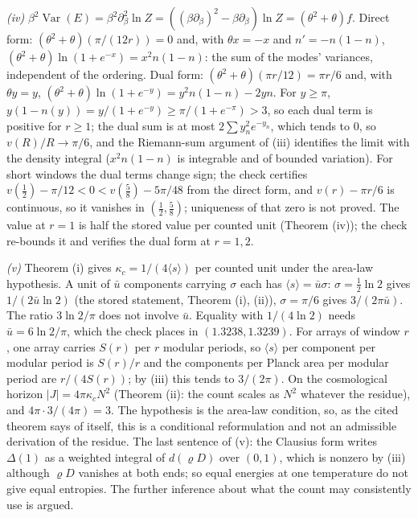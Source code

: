 \emph{(iv)} $\beta^{2}\operatorname{Var}(E) = \beta^{2}\partial_{\beta}^{2}\ln Z = ((\beta\partial_{\beta})^{2} - \beta\partial_{\beta})\ln Z = (\theta^{2} + \theta)f$. Direct form: $(\theta^{2} + \theta)(\pi/(12r)) = 0$ and, with $\theta x = -x$ and $n' = -n(1 - n)$, $(\theta^{2} + \theta)\ln(1 + e^{-x}) = x^{2}n(1 - n)$: the sum of the modes' variances, independent of the ordering. Dual form: $(\theta^{2} + \theta)(\pi r/12) = \pi r/6$ and, with $\theta y = y$, $(\theta^{2} + \theta)\ln(1 + e^{-y}) = y^{2}n(1 - n) - 2yn$. For $y \ge \pi$, $y(1 - n(y)) = y/(1 + e^{-y}) \ge \pi/(1 + e^{-\pi}) > 3$, so each dual term is positive for $r \ge 1$; the dual sum is at most $2\sum y_{n}^{2}e^{-y_{n}}$, which tends to $0$, so $v(R)/R \to \pi/6$, and the Riemann-sum argument of (iii) identifies the limit with the density integral ($x^{2}n(1 - n)$ is integrable and of bounded variation). For short windows the dual terms change sign; the check certifies $v(\tfrac12) - \pi/12 < 0 < v(\tfrac58) - 5\pi/48$ from the direct form, and $v(r) - \pi r/6$ is continuous, so it vanishes in $(\tfrac12, \tfrac58)$; uniqueness of that zero is not proved. The value at $r = 1$ is half the stored value per counted unit (Theorem (iv)); the check re-bounds it and verifies the dual form at $r = 1, 2$.

\emph{(v)} Theorem (i) gives $\kappa_{c} = 1/(4\langle s\rangle)$ per counted unit under the area-law hypothesis. A unit of $\bar u$ components carrying $\sigma$ each has $\langle s\rangle = \bar u\sigma$: $\sigma = \tfrac12\ln 2$ gives $1/(2\bar u\ln 2)$ (the stored statement, Theorem (i), (ii)), $\sigma = \pi/6$ gives $3/(2\pi\bar u)$. The ratio $3\ln 2/\pi$ does not involve $\bar u$. Equality with $1/(4\ln 2)$ needs $\bar u = 6\ln 2/\pi$, which the check places in $(1.3238, 1.3239)$. For arrays of window $r$, one array carries $S(r)$ per $r$ modular periods, so $\langle s\rangle$ per component per modular period is $S(r)/r$ and the components per Planck area per modular period are $r/(4S(r))$; by (iii) this tends to $3/(2\pi)$. On the cosmological horizon $|J| = 4\pi\kappa_{c}N^{2}$ (Theorem (ii): the count scales as $N^{2}$ whatever the residue), and $4\pi \cdot 3/(4\pi) = 3$. The hypothesis is the area-law condition, so, as the cited theorem says of itself, this is a conditional reformulation and not an admissible derivation of the residue. The last sentence of (v): the Clausius form writes $\Delta(1)$ as a weighted integral of $d(\varrho D)$ over $(0, 1)$, which is nonzero by (iii) although $\varrho D$ vanishes at both ends; so equal energies at one temperature do not give equal entropies. The further inference about what the count may consistently use is argued.

